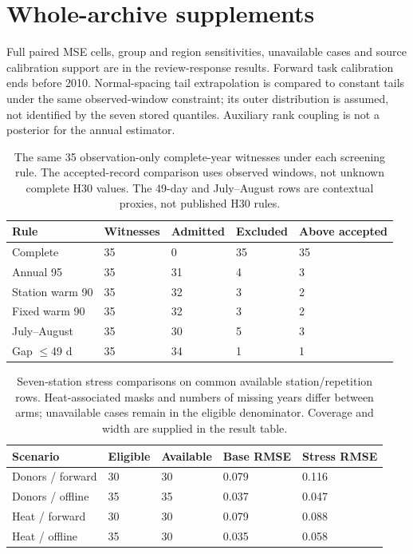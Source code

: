 \section{Whole-archive supplements}
Full paired MSE cells, group and region sensitivities, unavailable cases and source calibration support are in the review-response results. Forward task calibration ends before 2010. Normal-spacing tail extrapolation is compared to constant tails under the same observed-window constraint; its outer distribution is assumed, not identified by the seven stored quantiles. Auxiliary rank coupling is not a posterior for the annual estimator.
\begin{table}[p]\centering\small
\caption{The same 35 observation-only complete-year witnesses under each screening rule. The accepted-record comparison uses observed windows, not unknown complete H30 values. The 49-day and July--August rows are contextual proxies, not published H30 rules.}\label{tab:observed-rule-comparison}
\begin{tabular}{lllll}
\toprule
Rule & Witnesses & Admitted & Excluded & Above accepted\\\midrule
Complete & 35 & 0 & 35 & 35\\
Annual 95 & 35 & 31 & 4 & 3\\
Station warm 90 & 35 & 32 & 3 & 2\\
Fixed warm 90 & 35 & 32 & 3 & 2\\
July--August & 35 & 30 & 5 & 3\\
Gap $\leq$49 d & 35 & 34 & 1 & 1\\
\bottomrule\end{tabular}
\end{table}
\begin{table}[p]\centering\small
\caption{Seven-station stress comparisons on common available station/repetition rows. Heat-associated masks and numbers of missing years differ between arms; unavailable cases remain in the eligible denominator. Coverage and width are supplied in the result table.}\label{tab:small-stresses}
\begin{tabular}{lllll}
\toprule
Scenario & Eligible & Available & Base RMSE & Stress RMSE\\\midrule
Donors / forward & 30 & 30 & 0.079 & 0.116\\
Donors / offline & 35 & 35 & 0.037 & 0.047\\
Heat / forward & 30 & 30 & 0.079 & 0.088\\
Heat / offline & 35 & 30 & 0.035 & 0.058\\
\bottomrule\end{tabular}
\end{table}
